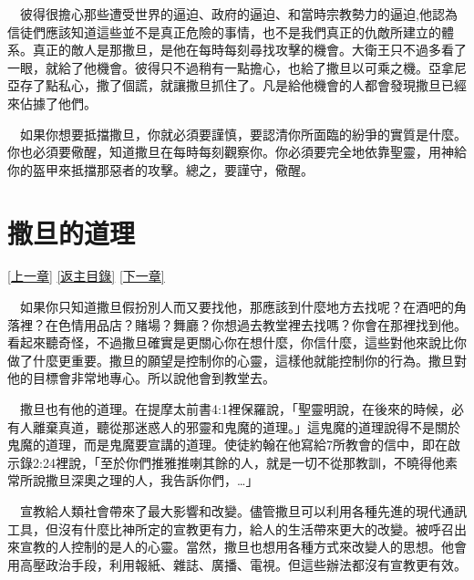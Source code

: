 \documentclass{book}
\begin{document}
　彼得很擔心那些遭受世界的逼迫、政府的逼迫、和當時宗教勢力的逼迫,他認為信徒們應該知道這些並不是真正危險的事情，也不是我們真正的仇敵所建立的體系。真正的敵人是那撒旦，是他在每時每刻尋找攻擊的機會。大衛王只不過多看了一眼，就給了他機會。彼得只不過稍有一點擔心，也給了撒旦以可乘之機。亞拿尼亞存了點私心，撒了個謊，就讓撒旦抓住了。凡是給他機會的人都會發現撒旦已經來佔據了他們。

　如果你想要抵擋撒旦，你就必須要謹慎，要認清你所面臨的紛爭的實質是什麼。你也必須要儆醒，知道撒旦在每時每刻觀察你。你必須要完全地依靠聖靈，用神給你的盔甲來抵擋那惡者的攻擊。總之，要謹守，儆醒。

\chapter{撒旦的道理}
\label{sec:ch11}
\hyperref[sec:ch10]{[上一章]}
\hyperlink{toc}{[返主目錄]}
\hyperref[sec:ch12]{[下一章]}

\begin{center}
\noindent{}
\end{center}

　如果你只知道撒旦假扮別人而又要找他，那應該到什麼地方去找呢？在酒吧的角落裡？在色情用品店？賭場？舞廳？你想過去教堂裡去找嗎？你會在那裡找到他。看起來聽奇怪，不過撒旦確實是更關心你在想什麼，你信什麼，這些對他來說比你做了什麼更重要。撒旦的願望是控制你的心靈，這樣他就能控制你的行為。撒旦對他的目標會非常地專心。所以說他會到教堂去。

　撒旦也有他的道理。在提摩太前書4:1裡保羅說，「聖靈明說，在後來的時候，必有人離棄真道，聽從那迷惑人的邪靈和鬼魔的道理。」這鬼魔的道理說得不是關於鬼魔的道理，而是鬼魔要宣講的道理。使徒約翰在他寫給7所教會的信中，即在啟示錄2:24裡說，「至於你們推雅推喇其餘的人，就是一切不從那教訓，不曉得他素常所說撒旦深奧之理的人，我告訴你們，…」

　宣教給人類社會帶來了最大影響和改變。儘管撒旦可以利用各種先進的現代通訊工具，但沒有什麼比神所定的宣教更有力，給人的生活帶來更大的改變。被呼召出來宣教的人控制的是人的心靈。當然，撒旦也想用各種方式來改變人的思想。他會用高壓政治手段，利用報紙、雜誌、廣播、電視。但這些辦法都沒有宣教更有效。
\end{document}
